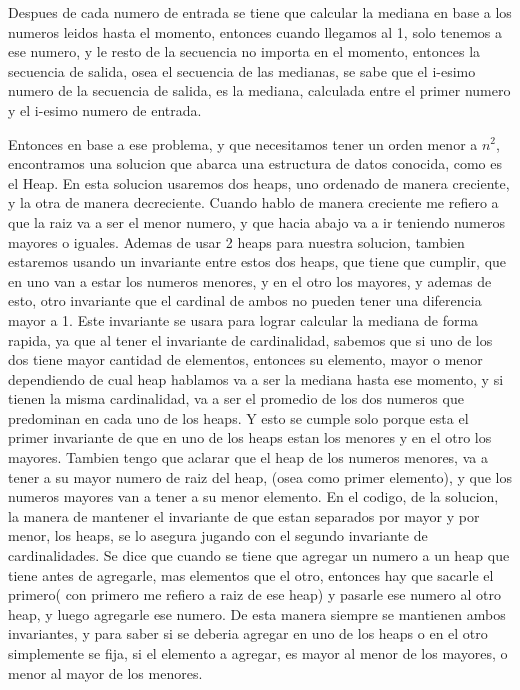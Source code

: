 Despues de cada numero de entrada se tiene que calcular la mediana en base a los numeros leidos hasta el momento,
entonces cuando llegamos al 1, solo tenemos a ese numero, y le resto de la secuencia no importa en el momento, entonces la secuencia de salida,
osea el secuencia de las medianas, se sabe que el i-esimo numero de la secuencia de salida, es la mediana, calculada entre el primer numero y el
i-esimo numero de entrada.

Entonces en base a ese problema, y que necesitamos tener un orden menor a $n^2$, encontramos una 
solucion que abarca una estructura de datos conocida, como es el Heap. En esta solucion usaremos dos heaps, uno ordenado de manera creciente,
y la otra de manera decreciente. Cuando hablo de manera creciente me refiero a que la raiz va a ser el menor numero, y que hacia abajo va a ir
teniendo numeros mayores o iguales. Ademas de usar 2 heaps para nuestra solucion, tambien estaremos usando un invariante entre estos dos heaps,
que tiene que cumplir, que en uno van a estar los numeros menores, y en el otro los mayores, y ademas de esto, otro invariante que el cardinal
de ambos no pueden tener una diferencia mayor a 1. Este invariante se usara para lograr calcular la mediana de forma rapida, ya que al tener el 
invariante de cardinalidad, sabemos que si uno de los dos tiene mayor cantidad de elementos, entonces su elemento, mayor o menor dependiendo de 
cual heap hablamos va a ser la mediana hasta ese momento, y si tienen la misma cardinalidad, va a ser el promedio de los dos numeros que 
predominan en cada uno de los heaps. Y esto se cumple solo porque esta el primer invariante de que en uno de los heaps estan los menores y en 
el otro los mayores.
Tambien tengo que aclarar que el heap de los numeros menores, va a tener a su mayor numero de raiz del heap, (osea como primer elemento), y que 
los numeros mayores van a tener a su menor elemento. En el codigo, de la solucion, la manera de mantener el invariante de que estan separados por
mayor y por menor, los heaps, se lo asegura jugando con el segundo invariante de cardinalidades. Se dice que cuando se tiene que agregar un numero
a un heap que tiene antes de agregarle, mas elementos que el otro, entonces hay que sacarle el primero( con primero me refiero a raiz de ese heap)
y pasarle ese numero al otro heap, y luego agregarle ese numero. De esta manera siempre se mantienen ambos invariantes, y para saber si se deberia
agregar en uno de los heaps o en el otro simplemente se fija, si el elemento a agregar, es mayor al menor de los mayores, o menor al mayor de
los menores.




